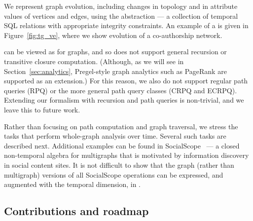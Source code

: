 
We represent graph evolution, including changes in topology and in
attribute values of vertices and edges, using the \tg abstraction ---
a collection of temporal SQL relations with appropriate integrity
constraints.  An example of a \tg is given in Figure~\ref{fig:tg_ve},
where we show evolution of a co-authorship network.

\tga can be viewed as \tra for graphs, and so does not support general
recursion or transitive closure computation. (Although, as we will see
in Section~\ref{sec:analytics}, Pregel-style graph analytics such as
PageRank are supported as an extension.)  For this reason, we also do
not support regular path queries (RPQ) or the more general path query
classes (CRPQ and ECRPQ).  Extending our formalism with recursion and
path queries is non-trivial, and we leave this to future work.

Rather than focusing on path computation and graph traversal, we
stress the tasks that perform whole-graph analysis over time.  Several
such tasks are described next.  Additional examples can be found in
SocialScope~\cite{Amer-Yahia2009} --- a closed non-temporal algebra
for multigraphs that is motivated by information discovery in social
content sites.  It is not difficult to show that the graph (rather
than multigraph) versions of all SocialScope operations can be
expressed, and augmented with the temporal dimension, in \tga.



\subsection{Contributions and roadmap}

